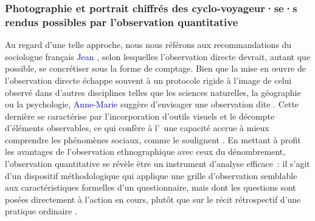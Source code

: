 \begin{refsegment}
\subsubsection*{Photographie et portrait chiffrés des cyclo-voyageur·se·s rendus possibles par l'observation quantitative
    \label{chap3:enjeux-observation-quantitative}
    }
    
Au regard d'une telle approche, nous nous référons aux recommandations du sociologue français \textcolor{blue}{Jean} \textcolor{blue}{\textcite[126]{peneff_mesure_1995}}, selon lesquelles l’observation directe devrait, autant que possible, se concrétiser sous la forme de comptage. Bien que la mise en œuvre de l’observation directe échappe souvent à un protocole rigide à l'image de celui observé dans d'autres disciplines telles que les sciences naturelles, la géographie ou la psychologie, \textcolor{blue}{Anne-Marie} \textcolor{blue}{\textcite[26]{arborio_observation_2007}} suggère d'envisager une observation dite . Cette dernière se caractérise par l'incorporation d'outils visuels et le décompte d'éléments observables, ce qui confère à l'~une capacité accrue à mieux comprendre les phénomènes sociaux, comme le soulignent \textcolor{blue}{\textcite[100]{cochoy_mort_2013}}. En mettant à profit les avantages de l'observation ethnographique avec ceux du dénombrement, l’observation quantitative se révèle être un instrument d'analyse efficace~: il s'agit d'un dispositif méthodologique qui applique une grille d’observation semblable aux caractéristiques formelles d’un questionnaire, mais dont les questions sont posées directement à l'action en cours, plutôt que sur le récit rétrospectif d'une pratique ordinaire \textcolor{blue}{\autocite[100]{cochoy_mort_2013}}.%


\end{refsegment}
